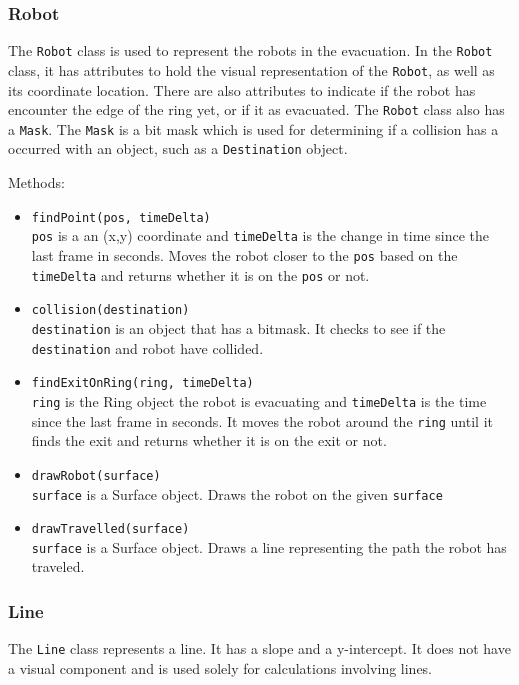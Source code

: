 \documentclass[12pt,letterpaper]{article}
\begin{document}
    \subsubsection{Robot}
        The \texttt{Robot} class is used to represent the robots in the evacuation. In the \texttt{Robot} class, it has attributes to hold the visual representation of the \texttt{Robot}, as well as its coordinate location. There are also attributes to indicate if the robot has encounter the edge of the ring yet, or if it as evacuated. The \texttt{Robot} class also has a \texttt{Mask}. The \texttt{Mask} is a bit mask which is used for determining if a collision has a occurred with an object, such as a \texttt{Destination} object.
        
        \noindent Methods:
        \begin{itemize}
            \item \texttt{findPoint(pos, timeDelta)} \\
                \texttt{pos} is a an (x,y) coordinate and \texttt{timeDelta} is the change in time since the last frame in seconds. Moves the robot closer to the \texttt{pos} based on the \texttt{timeDelta} and returns whether it is on the \texttt{pos} or not.
            \item \texttt{collision(destination)} \\
                \texttt{destination} is an object that has a bitmask. It checks to see if the \texttt{destination} and robot have collided.
            \item \texttt{findExitOnRing(ring, timeDelta)} \\
                \texttt{ring} is the Ring object the robot is evacuating and \texttt{timeDelta} is the time since the last frame in seconds. It moves the robot around the \texttt{ring} until it finds the exit and returns whether it is on the exit or not.
            \item \texttt{drawRobot(surface)} \\
                \texttt{surface} is a Surface object. Draws the robot on the given \texttt{surface}
            \item \texttt{drawTravelled(surface)} \\
                \texttt{surface} is a Surface object. Draws a line representing the path the robot has traveled.
        \end{itemize}

    \subsubsection{Line}
        The \texttt{Line} class represents a line. It has a slope and a y-intercept. It does not have a visual component and is used solely for calculations involving lines.
    
\end{document}
